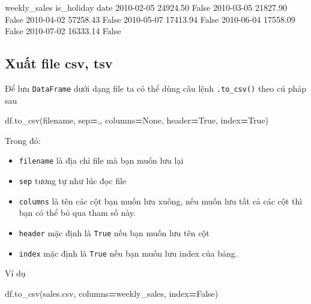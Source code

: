 \documentclass[
]{book}
\newenvironment{Shaded}{\begin{snugshade}}{\end{snugshade}}
\newcommand{\NormalTok}[1]{#1}
\newcommand{\OperatorTok}[1]{\textcolor[rgb]{0.81,0.36,0.00}{\textbf{#1}}}
\newcommand{\StringTok}[1]{\textcolor[rgb]{0.31,0.60,0.02}{#1}}
\newcommand{\VariableTok}[1]{\textcolor[rgb]{0.00,0.00,0.00}{#1}}
\begin{document}
\begin{Shaded}
\begin{Highlighting}[]
\NormalTok{            weekly\_sales  is\_holiday}
\NormalTok{date                                }
\NormalTok{2010{-}02{-}05      24924.50       False}
\NormalTok{2010{-}03{-}05      21827.90       False}
\NormalTok{2010{-}04{-}02      57258.43       False}
\NormalTok{2010{-}05{-}07      17413.94       False}
\NormalTok{2010{-}06{-}04      17558.09       False}
\NormalTok{2010{-}07{-}02      16333.14       False}
\end{Highlighting}
\end{Shaded}

\subsection{Xuất file csv, tsv}\label{xuux1ea5t-file-csv-tsv}

Để lưu \texttt{DataFrame} dưới dạng file ta có thể dùng câu lệnh \texttt{.to\_csv()} theo cú pháp sau

\begin{Shaded}
\begin{Highlighting}[]
\NormalTok{df.to\_csv(filename, sep}\OperatorTok{=}\StringTok{\textquotesingle{},\textquotesingle{}}\NormalTok{, columns}\OperatorTok{=}\VariableTok{None}\NormalTok{, header}\OperatorTok{=}\VariableTok{True}\NormalTok{, index}\OperatorTok{=}\VariableTok{True}\NormalTok{)}
\end{Highlighting}
\end{Shaded}

Trong đó:

\begin{itemize}
\item
  \texttt{filename} là địa chỉ file mà bạn muốn lưu lại
\item
  \texttt{sep} tương tự như lúc đọc file
\item
  \texttt{columns} là tên các cột bạn muốn lưu xuống, nếu muốn lưu tất cả các cột thì
  bạn có thể bỏ qua tham số này.
\item
  \texttt{header} mặc định là \texttt{True} nếu bạn muốn lưu tên cột
\item
  \texttt{index} mặc định là \texttt{True} nếu bạn muốn lưu index của bảng.
\end{itemize}

Ví dụ

\begin{Shaded}
\begin{Highlighting}[]
\NormalTok{df.to\_csv(}\StringTok{\textquotesingle{}sales.csv\textquotesingle{}}\NormalTok{, columns}\OperatorTok{=}\StringTok{\textquotesingle{}weekly\_sales\textquotesingle{}}\NormalTok{, index}\OperatorTok{=}\VariableTok{False}\NormalTok{)}
\end{Highlighting}
\end{Shaded}
\end{document}
